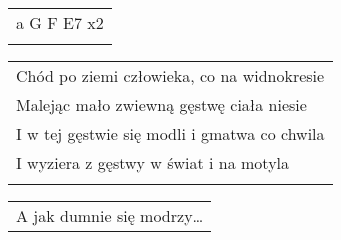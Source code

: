 \documentclass[a5paper]{article}
\begin{document}
\noindent
\begin{tabular}{@{}p{9.00cm}@{}}
a G F E7 x2 \\ \\
\end{tabular}

\noindent
\begin{tabular}{@{}p{9.00cm}@{}}
Chód po ziemi człowieka, co na widnokresie \\
Malejąc mało zwiewną gęstwę ciała niesie \\
I w tej gęstwie się modli i gmatwa co chwila \\
I wyziera z gęstwy w świat i na motyla \\ \\
\end{tabular}

\noindent
\begin{tabular}{@{}p{8.00cm}@{}}
A jak dumnie się modrzy…
\end{tabular}
\end{document}
